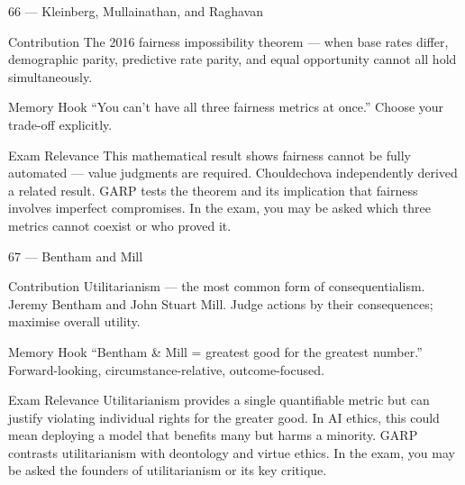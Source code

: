 \documentclass[aspectratio=169,8pt]{beamer}
\begin{document}
	\begin{frame}{66 --- Kleinberg, Mullainathan, and Raghavan}
		\begin{block}{Contribution}
			The 2016 fairness impossibility theorem --- when base rates differ, demographic parity, predictive rate parity, and equal opportunity cannot all hold simultaneously.
		\end{block}
		\begin{block}{Memory Hook}
			``You can't have all three fairness metrics at once.'' Choose your trade-off explicitly.
		\end{block}
		\begin{block}{Exam Relevance}
			This mathematical result shows fairness cannot be fully automated --- value judgments are required. Chouldechova independently derived a related result. GARP tests the theorem and its implication that fairness involves imperfect compromises. In the exam, you may be asked which three metrics cannot coexist or who proved it.
		\end{block}
	\end{frame}
	
	\begin{frame}{67 --- Bentham and Mill}
		\begin{block}{Contribution}
			Utilitarianism --- the most common form of consequentialism. Jeremy Bentham and John Stuart Mill. Judge actions by their consequences; maximise overall utility.
		\end{block}
		\begin{block}{Memory Hook}
			``Bentham \& Mill = greatest good for the greatest number.'' Forward-looking, circumstance-relative, outcome-focused.
		\end{block}
		\begin{block}{Exam Relevance}
			Utilitarianism provides a single quantifiable metric but can justify violating individual rights for the greater good. In AI ethics, this could mean deploying a model that benefits many but harms a minority. GARP contrasts utilitarianism with deontology and virtue ethics. In the exam, you may be asked the founders of utilitarianism or its key critique.
		\end{block}
	\end{frame}
	
\end{document}
